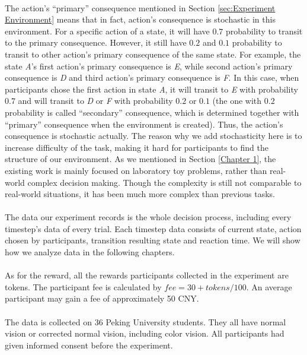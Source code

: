 \paragraph{}
The action's \enquote{primary} consequence mentioned in Section \ref{sec:Experiment Environment} means that in fact, action's consequence is stochastic in this environment. For a specific action of a state, it will have $0.7$ probability to transit to the primary consequence. However, it still have $0.2$ and $0.1$ probability to transit to other action's primary consequence of the same state. For example, the state \emph{A}'s first action's primary consequence is \emph{E}, while second action's primary consequence is \emph{D} and third action's primary consequence is \emph{F}. In this case, when participants chose the first action in state \emph{A}, it will transit to \emph{E} with probability $0.7$ and will transit to \emph{D} or \emph{F} with probability $0.2$ or $0.1$ (the one with $0.2$ probability is called \enquote{secondary} consequence, which is determined together with \enquote{primary} consequence when the environment is created). Thus, the action's consequence is stochastic actually. The reason why we add stochasticity here is to increase difficulty of the task, making it hard for participants to find the structure of our environment. As we mentioned in Section \ref{Chapter 1}, the existing work is mainly focused on laboratory toy problems, rather than real-world complex decision making. Though the complexity is still not comparable to real-world situations, it has been much more complex than previous tasks. 
\paragraph{}
The data our experiment records is the whole decision process, including every timestep's data of every trial. Each timestep data consists of current state, action chosen by participants, transition resulting state and reaction time. We will show how we analyze data in the following chapters. 
\paragraph{}
As for the reward, all the rewards participants collected in the experiment are tokens. The participant fee is calculated by $fee = 30 + tokens / 100$. An average participant may gain a fee of approximately 50 CNY. 
\paragraph{}
The data is collected on 36 Peking University students. They all have normal vision or corrected normal vision, including color vision. All participants had given informed consent before the experiment. 




